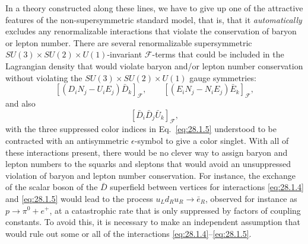 In a theory constructed along these lines, we have to give up one of the
attractive features of the non-supersymmetric standard model, that is,
that it \textit{automatically} excludes any renormalizable interactions
that violate the conservation of baryon or lepton number. There are
several renormalizable supersymmetric
\(SU(3)\times SU(2)\times U(1)\)-invariant
\(\mathcal{F}\)-terms that could be included in the Lagrangian density
that would violate baryon and/or lepton number conservation without
violating the \(SU(3)\times SU(2)\times U(1)\) gauge
symmetries:
\begin{equation}
  \left[(D_iN_j-U_iE_j)\bar D_k\right]_{\mathcal{F}},
  \qquad
  \left[(E_iN_j-N_iE_j)\bar E_k\right]_{\mathcal{F}},
  \tag{28.1.4}\label{eq:28.1.4}
\end{equation}
and also
\begin{equation}
  \left[\bar D_i\bar D_j\bar U_k\right]_{\mathcal{F}},
  \tag{28.1.5}\label{eq:28.1.5}
\end{equation}
with the three suppressed color indices in Eq.~\eqref{eq:28.1.5}
understood to be contracted with an antisymmetric \(\epsilon\)-symbol to
give a color singlet. With all of these interactions present, there
would be no clever way to assign baryon and lepton numbers to the
squarks and sleptons that would avoid an unsuppressed violation of
baryon and lepton number conservation. For instance, the exchange of
the scalar boson of the \(\bar D\) superfield between vertices for
interactions \eqref{eq:28.1.4} and \eqref{eq:28.1.5} would lead to the
process \(u_Ld_Ru_R\longrightarrow\bar e_R\), observed for instance as
\(p\longrightarrow\pi^0+e^+\), at a catastrophic rate that is only
suppressed by factors of coupling constants. To avoid this, it is
necessary to make an independent assumption that would rule out some or
all of the interactions \eqref{eq:28.1.4}--\eqref{eq:28.1.5}.

